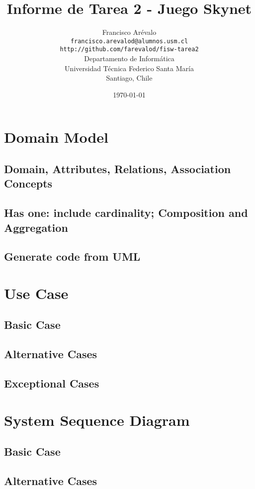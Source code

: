 \documentclass{beamer}
\title{Informe de Tarea 2 - Juego Skynet}
\author{Francisco Ar\'evalo\\
  \texttt{francisco.arevalod@alumnos.usm.cl}\\
  \texttt{http://github.com/farevalod/fisw-tarea2}\\
  \vspace{10mm}
  Departamento de Inform\'atica\\
  Universidad T\'ecnica Federico Santa Mar\'ia\\
  Santiago, Chile}
\date{\today}
\begin{document}
\maketitle
\tableofcontents
\section{Domain Model}
\begin{frame}
\subsection{Domain, Attributes, Relations, Association Concepts}
\subsection{Has one: include cardinality; Composition and Aggregation}
\subsection{Generate code from UML}
\end{frame}
\section{Use Case}
\begin{frame}
\subsection{Basic Case}
\subsection{Alternative Cases}
\subsection{Exceptional Cases}
\end{frame}
\section{System Sequence Diagram}
\begin{frame}
\subsection{Basic Case}
\subsection{Alternative Cases}
\end{frame}
\end{document}
